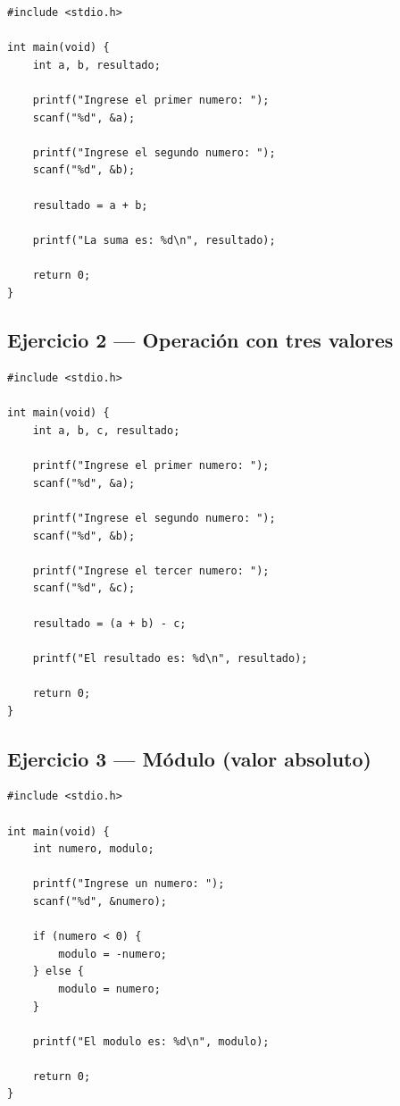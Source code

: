 \begin{lstlisting}[style=estilo-c]
#include <stdio.h>

int main(void) {
    int a, b, resultado;

    printf("Ingrese el primer numero: ");
    scanf("%d", &a);

    printf("Ingrese el segundo numero: ");
    scanf("%d", &b);

    resultado = a + b;

    printf("La suma es: %d\n", resultado);

    return 0;
}
\end{lstlisting}

\subsection{Ejercicio 2 --- Operación con tres valores}

\begin{lstlisting}[style=estilo-c]
#include <stdio.h>

int main(void) {
    int a, b, c, resultado;

    printf("Ingrese el primer numero: ");
    scanf("%d", &a);

    printf("Ingrese el segundo numero: ");
    scanf("%d", &b);

    printf("Ingrese el tercer numero: ");
    scanf("%d", &c);

    resultado = (a + b) - c;

    printf("El resultado es: %d\n", resultado);

    return 0;
}
\end{lstlisting}

\subsection{Ejercicio 3 --- Módulo (valor absoluto)}

\begin{lstlisting}[style=estilo-c]
#include <stdio.h>

int main(void) {
    int numero, modulo;

    printf("Ingrese un numero: ");
    scanf("%d", &numero);

    if (numero < 0) {
        modulo = -numero;
    } else {
        modulo = numero;
    }

    printf("El modulo es: %d\n", modulo);

    return 0;
}
\end{lstlisting}

